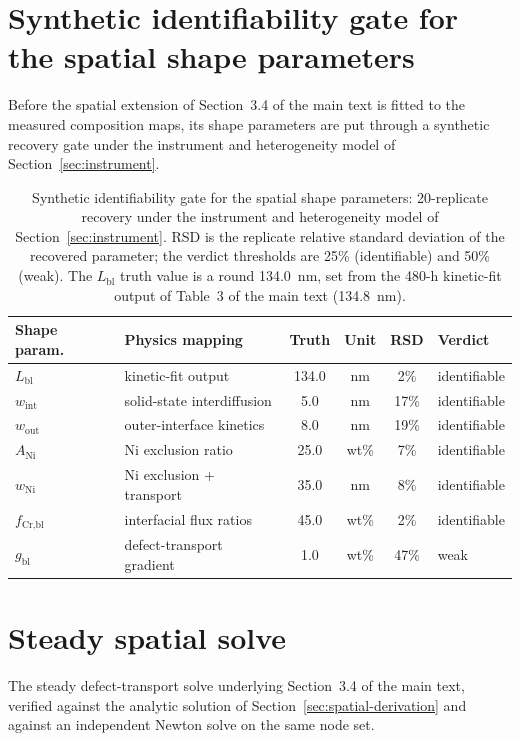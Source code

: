 \section{Synthetic identifiability gate for the spatial shape parameters}
\label{sec:gate}

Before the spatial extension of Section~3.4 of the main text is fitted to the
measured composition maps, its shape parameters are put through a synthetic
recovery gate under the instrument and heterogeneity model of
Section~\ref{sec:instrument}.

\begin{table}[htbp]
\centering
\caption{Synthetic identifiability gate for the spatial shape
parameters: 20-replicate recovery under the instrument and
heterogeneity model of Section~\ref{sec:instrument}. RSD is the replicate relative
standard deviation of the recovered parameter; the verdict thresholds
are 25\% (identifiable) and 50\% (weak). The $L_\text{bl}$ truth value is a round 134.0~nm,
set from the 480-h kinetic-fit output of Table~3 of the main text
(134.8~nm).}
\label{tab:t2a}
\begin{tabular}{llcccl}
\toprule
Shape param. & Physics mapping & Truth & Unit & RSD & Verdict \\
\midrule
$L_\text{bl}$ & kinetic-fit output & 134.0 & nm & 2\% & identifiable \\
$w_\text{int}$ & solid-state interdiffusion & 5.0 & nm & 17\% & identifiable \\
$w_\text{out}$ & outer-interface kinetics & 8.0 & nm & 19\% & identifiable \\
$A_\text{Ni}$ & Ni exclusion ratio & 25.0 & wt\% & 7\% & identifiable \\
$w_\text{Ni}$ & Ni exclusion + transport & 35.0 & nm & 8\% & identifiable \\
$f_\text{Cr,bl}$ & interfacial flux ratios & 45.0 & wt\% & 2\% & identifiable \\
$g_\text{bl}$ & defect-transport gradient & 1.0 & wt\% & 47\% & weak \\
\bottomrule
\end{tabular}
\end{table}

\section{Steady spatial solve}
\label{sec:steadysolve}

The steady defect-transport solve underlying Section~3.4 of the main text,
verified against the analytic solution of Section~\ref{sec:spatial-derivation}
and against an independent Newton solve on the same node set.

